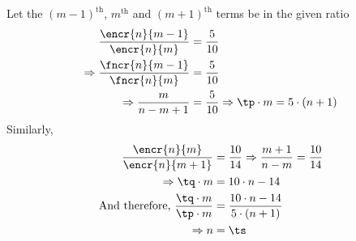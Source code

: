 \insertQR[-15pt]{}

\watchout

\ifprintanswers
\fi 

\begin{solution}
	Let the $(m-1)^{\text{th}}$, $m^{\text{th}}$ and $(m+1)^{\text{th}}$ terms be in the given ratio
	\begin{align}
		\dfrac{\encr{n}{m-1}}{\encr{n}{m}} &= \dfrac{\vbone}{\vbtwo} \\
		\Rightarrow \dfrac{\fncr{n}{m-1}}{\fncr{n}{m}} &= \dfrac{\vbone}{\vbtwo} \\
		\Rightarrow \dfrac{m}{n-m+1} &= \dfrac{\vbone}{\vbtwo} \Rightarrow \tp\cdot m = \vbone\cdot(n+1)
	\end{align}
	Similarly,
	\begin{align}
		\dfrac{\encr{n}{m}}{\encr{n}{m+1}} &= \dfrac{\vbtwo}{\vbthree} \Rightarrow \dfrac{m+1}{n-m} = \dfrac{\vbtwo}{\vbthree} \\
		\Rightarrow \tq\cdot m &= \vbtwo\cdot n - \vbthree \\
		\text{And therefore, } \dfrac{\tq\cdot m}{\tp\cdot m} &= \dfrac{\vbtwo\cdot n - \vbthree}{\vbone\cdot(n+1)} \\
		\Rightarrow n &= \ts
	\end{align}
\end{solution}
